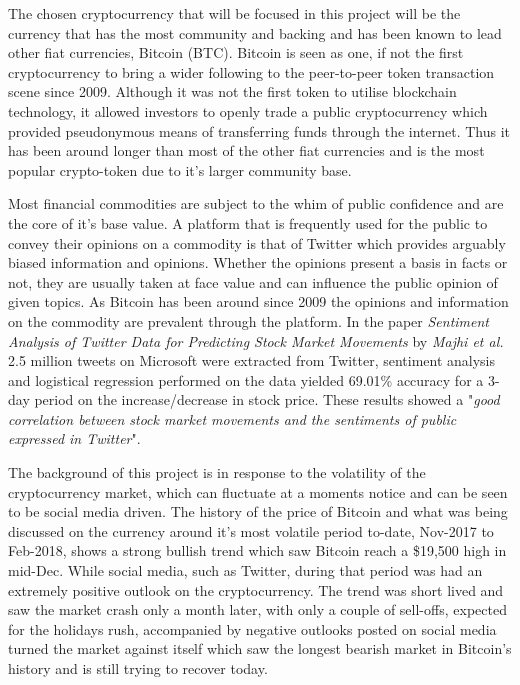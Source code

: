 \documentclass[oneside, 10pt]{article}
\begin{document}
	The chosen cryptocurrency that will be focused in this project will be the currency that has the most community and backing and has been known to lead other fiat currencies, Bitcoin (BTC). Bitcoin is seen as one, if not the first cryptocurrency to bring a wider following to the peer-to-peer token transaction scene since 2009. Although it was not the first token to utilise blockchain technology, it allowed investors to openly trade a public cryptocurrency which provided pseudonymous means of transferring funds through the internet. Thus it has been around longer than most of the other fiat currencies and is the most popular crypto-token due to it's larger community base.
	
	Most financial commodities are subject to the whim of public confidence and are the core of it's base value. A platform that is frequently used for the public to convey their opinions on a commodity is that of Twitter which provides arguably biased information and opinions. Whether the opinions present a basis in facts or not, they are usually taken at face value and can influence the public opinion of given topics. As Bitcoin has been around since 2009 the opinions and information on the commodity are prevalent through the platform. 
	In the paper \textit{Sentiment Analysis of Twitter Data for Predicting Stock Market Movements} by \textit{Majhi et al.} \cite{1} 2.5 million tweets on Microsoft were extracted from Twitter, sentiment analysis and logistical regression performed on the data yielded 69.01\% accuracy for a 3-day period on the increase/decrease in stock price. These results showed a "\textit{good correlation between stock market movements and the sentiments of public expressed in Twitter}".
	
	The background of this project is in response to the volatility of the cryptocurrency market, which can fluctuate at a moments notice and can be seen to be social media driven. The history of the price of Bitcoin and what was being discussed on the currency around it's most volatile period to-date, Nov-2017 to Feb-2018, shows a strong bullish trend which saw Bitcoin reach a \$19,500 high in mid-Dec. While social media, such as Twitter, during that period was had an extremely positive outlook on the cryptocurrency. The trend was short lived and saw the market crash only a month later, with only a couple of sell-offs, expected for the holidays rush, accompanied by negative outlooks posted on social media turned the market against itself which saw the longest bearish market in Bitcoin's history and is still trying to recover today.
	
\end{document}
